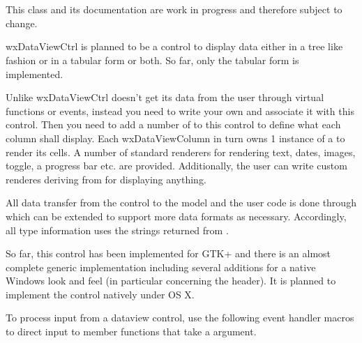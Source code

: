 
\section{}\label{wxdataviewctrl}

This class and its documentation are work in progress and
therefore subject to change.

wxDataViewCtrl is planned to be a control to display data either
in a tree like fashion or in a tabular form or both. So far,
only the tabular form is implemented. 

Unlike  wxDataViewCtrl doesn't 
get its data from the user through virtual functions or events,
instead you need to write your own 
 and associate
it with this control. Then you need to add a number of
 to this control to
define what each column shall display. Each wxDataViewColumn
in turn owns 1 instance of a 
 to render its
cells. A number of standard renderers for rendering text, dates,
images, toggle, a progress bar etc. are provided. Additionally,
the user can write custom renderes deriving from 
for displaying anything.

All data transfer from the control to the model and the user
code is done through  which can
be extended to support more data formats as necessary. 
Accordingly, all type information uses the strings returned
from .

So far, this control has been implemented for GTK+ and there
is an almost complete generic implementation including several
additions for a native Windows look and feel (in particular
concerning the header). It is planned to implement the control
natively under OS X.


\twocolwidtha{5cm}
\begin{twocollist}\itemsep=0pt
\end{twocollist}



To process input from a dataview control, use the following event handler
macros to direct input to member functions that take a 
 argument.

